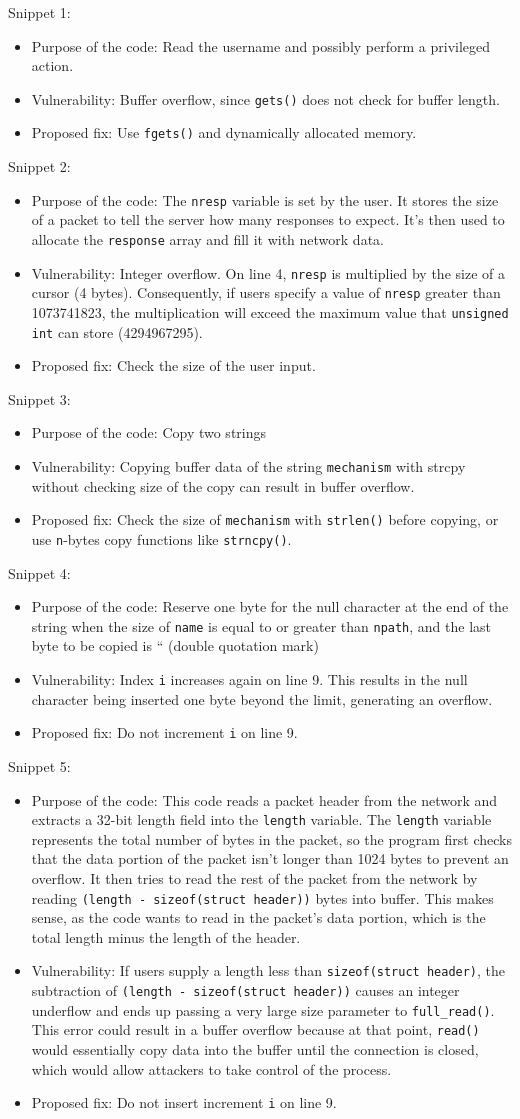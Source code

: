 \documentclass[12pt,a4paper]{article}
\newcommand{\solution}[3]{
\begin{itemize}
\item Purpose of the code: #1
\item Vulnerability: #2
\item Proposed fix: #3
\end{itemize}
}
\begin{document}
\noindent
Snippet 1:
\solution
{Read the username and possibly perform a privileged action.}
{Buffer overflow, since \texttt{gets()} does not check for buffer length.}
{Use \texttt{fgets()} and dynamically allocated memory.}

\noindent
Snippet 2:
\solution
{The \texttt{nresp} variable is set by the user. It stores the size of a packet to tell the server how many responses to expect. It's then used to allocate the \texttt{response} array and fill it with network data.}
{Integer overflow. On line 4, \texttt{nresp} is multiplied by the size of a cursor (4 bytes). Consequently, if users specify a value of \texttt{nresp} greater than 1073741823, the multiplication will exceed the maximum value that \texttt{unsigned int} can store (4294967295).}
{Check the size of the user input.}

\noindent
Snippet 3:
\solution
{Copy two strings}
{Copying buffer data of the string \texttt{mechanism} with strcpy without checking size of the copy can result in buffer overflow.}
{Check the size of \texttt{mechanism} with \texttt{strlen()} before copying, or use \texttt{n}-bytes copy functions like \texttt{strncpy()}.}

\noindent
Snippet 4:
\solution
{Reserve one byte for the null character at the end of the string when the size of \texttt{name} is equal to or greater than \texttt{npath}, and the last byte to be copied is “ (double quotation mark)}
{Index \texttt{i} increases again on line 9. This results in the null character being inserted one byte beyond the limit, generating an overflow.}
{Do not increment \texttt{i} on line 9.}

\noindent
Snippet 5:
\solution
{This code reads a packet header from the network and extracts a 32-bit length
field into the \texttt{length} variable. The \texttt{length} variable represents the total number of bytes in the packet, so the program first checks that the data portion of the packet isn't longer than 1024 bytes to prevent an overflow. It then tries to read the rest of the packet from the network by reading \texttt{(length - sizeof(struct header))} bytes into buffer. This makes sense, as the code wants to read in the packet's data portion, which is the total length minus the length of the header.}
{If users supply a length less than \texttt{sizeof(struct header)}, the subtraction of \texttt{(length - sizeof(struct header))} causes an integer underflow and ends up passing a very large size parameter to \texttt{full\_read()}. This error could result in a buffer overflow because at that point, \texttt{read()} would essentially copy data into the buffer until the connection is closed, which would allow attackers to take control of the process.}
{Do not insert increment \texttt{i} on line 9.}
\end{document}

